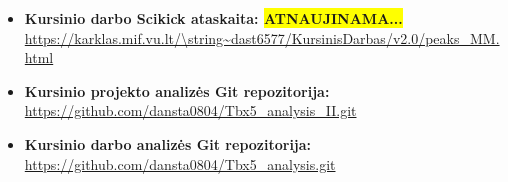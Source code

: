 \documentclass[12pt]{article}
\begin{document}
\begin{itemize}
    \item \textbf{Kursinio darbo Scikick ataskaita: \colorbox{yellow}{ATNAUJINAMA...}}\\
        \url{https://karklas.mif.vu.lt/\string~dast6577/KursinisDarbas/v2.0/peaks\_MM.html}
    \item \textbf{Kursinio projekto analizės Git repozitorija:}\\
        \url{https://github.com/dansta0804/Tbx5\_analysis\_II.git}
    \item \textbf{Kursinio darbo analizės Git repozitorija:}\\
        \url{https://github.com/dansta0804/Tbx5\_analysis.git}
  \end{itemize}
\end{document}
